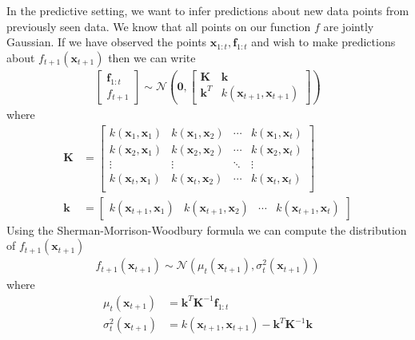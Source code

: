 In the predictive setting, we want to infer predictions about new data points from previously seen data. We know that all points on our function \( f \) are jointly Gaussian. If we have observed the points \( \mathbf{x}_{1:t}, \mathbf{f}_{1:t} \) and wish to make predictions about \( f_{t+1}(\mathbf{x}_{t+1}) \) then we can write
\begin{align}
	\begin{bmatrix}
		\mathbf{f}_{1:t} \\
		f_{t+1}
	\end{bmatrix}
	\sim 
	\mathcal{N} \left( \mathbf{0}, 
	\begin{bmatrix}
		\mathbf{K} & \mathbf{k}\\
		\mathbf{k}^T & k(\mathbf{x}_{t+1}, \mathbf{x}_{t+1})
	\end{bmatrix} \right)
\end{align}
where 
\begin{align}
	\mathbf{K} &= \begin{bmatrix}
		k(\mathbf{x}_1, \mathbf{x}_1) & k(\mathbf{x}_1, \mathbf{x}_2) & \cdots & k(\mathbf{x}_1, \mathbf{x}_t)\\
		k(\mathbf{x}_2, \mathbf{x}_1)& k(\mathbf{x}_2, \mathbf{x}_2) & \cdots & k(\mathbf{x}_2, \mathbf{x}_t)\\
		\vdots & \vdots & \ddots & \vdots\\
		k(\mathbf{x}_t, \mathbf{x}_1)& k(\mathbf{x}_t, \mathbf{x}_2) & \cdots & k(\mathbf{x}_t, \mathbf{x}_t)\\
	\end{bmatrix}
	\\
	\mathbf{k} &= \begin{bmatrix}
	k(\mathbf{x}_{t+1}, \mathbf{x}_1)& k(\mathbf{x}_{t+1}, \mathbf{x}_2) & \cdots & k(\mathbf{x}_{t+1}, \mathbf{x}_t)
	\end{bmatrix}
\end{align}
Using the  Sherman-Morrison-Woodbury formula we can compute the distribution of \( f_{t+1}(\mathbf{x}_{t+1}) \)
\begin{align}
	f_{t+1}(\mathbf{x}_{t+1}) \sim \mathcal{N}(\mu_t(\mathbf{x}_{t+1}), \sigma^2_t(\mathbf{x}_{t+1}))
\end{align}
where
\begin{align}
	\mu_t(\mathbf{x}_{t+1}) &= \mathbf{k}^T\mathbf{K}^{-1}\mathbf{f}_{1:t}\\
	\sigma_t^2(\mathbf{x}_{t+1}) &= k(\mathbf{x}_{t+1}, \mathbf{x}_{t+1}) - \mathbf{k}^T\mathbf{K}^{-1}\mathbf{k}
\end{align}
